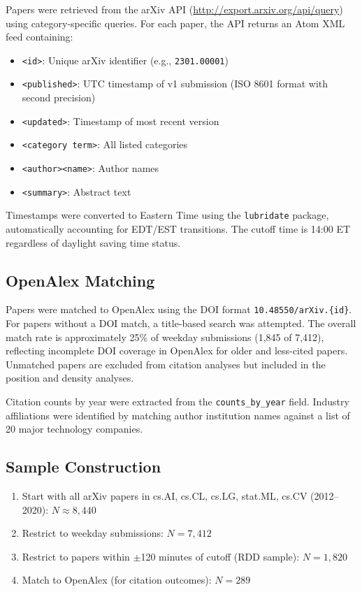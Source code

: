 \documentclass[12pt]{article}
\begin{document}
Papers were retrieved from the arXiv API (\url{http://export.arxiv.org/api/query}) using category-specific queries. For each paper, the API returns an Atom XML feed containing:

\begin{itemize}
\item \texttt{<id>}: Unique arXiv identifier (e.g., \texttt{2301.00001})
\item \texttt{<published>}: UTC timestamp of v1 submission (ISO 8601 format with second precision)
\item \texttt{<updated>}: Timestamp of most recent version
\item \texttt{<category term>}: All listed categories
\item \texttt{<author><name>}: Author names
\item \texttt{<summary>}: Abstract text
\end{itemize}

Timestamps were converted to Eastern Time using the \texttt{lubridate} package, automatically accounting for EDT/EST transitions. The cutoff time is 14:00 ET regardless of daylight saving time status.

\subsection{OpenAlex Matching}

Papers were matched to OpenAlex using the DOI format \texttt{10.48550/arXiv.\{id\}}. For papers without a DOI match, a title-based search was attempted. The overall match rate is approximately 25\% of weekday submissions (1,845 of 7,412), reflecting incomplete DOI coverage in OpenAlex for older and less-cited papers. Unmatched papers are excluded from citation analyses but included in the position and density analyses.

Citation counts by year were extracted from the \texttt{counts\_by\_year} field. Industry affiliations were identified by matching author institution names against a list of 20 major technology companies.

\subsection{Sample Construction}

\begin{enumerate}
\item Start with all arXiv papers in cs.AI, cs.CL, cs.LG, stat.ML, cs.CV (2012--2020): $N \approx 8{,}440$
\item Restrict to weekday submissions: $N = 7{,}412$
\item Restrict to papers within $\pm$120 minutes of cutoff (RDD sample): $N = 1{,}820$
\item Match to OpenAlex (for citation outcomes): $N = 289$
\end{enumerate}
\end{document}
